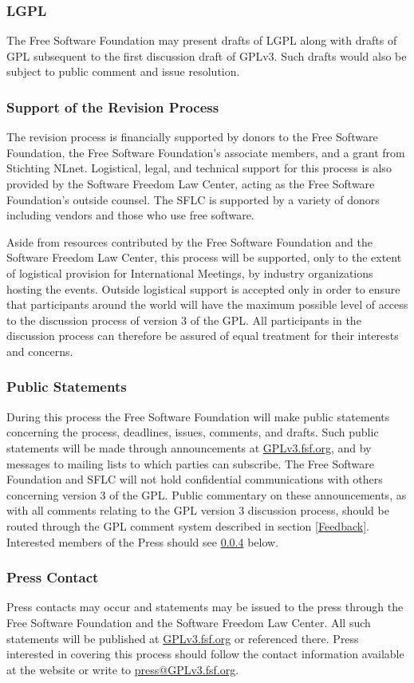 \documentclass[a4paper,spanish,12pt]{book}
\begin{document}
\subsubsection{LGPL} The Free Software Foundation may present drafts of LGPL
along with drafts of GPL subsequent to the first discussion draft of
GPLv3.  Such drafts would also be subject to public comment and issue
resolution.

\subsubsection{Support of the Revision Process} The revision process is
financially supported by donors to the Free Software Foundation, the
Free Software Foundation's associate members, and a grant from
Stichting NLnet.  Logistical, legal, and technical support for this
process is also provided by the Software Freedom Law Center, acting as
the Free Software Foundation's outside counsel.  The SFLC is supported
by a variety of donors including vendors and those who use free
software.

Aside from resources contributed by the Free Software Foundation and
the Software Freedom Law Center, this process will be supported, only
to the extent of logistical provision for International Meetings, by
industry organizations hosting the events.  Outside logistical support
is accepted only in order to ensure that participants around the world
will have the maximum possible level of access to the discussion
process of version 3 of the GPL\@.  All participants in the discussion
process can therefore be assured of equal treatment for their
interests and concerns.

\subsubsection{Public Statements} During this process the Free Software
Foundation will make public statements concerning the process,
deadlines, issues, comments, and drafts.  Such public statements will
be made through announcements at \url{GPLv3.fsf.org}, and by
messages to mailing lists to which parties can subscribe.  The Free
Software Foundation and SFLC will not hold confidential communications
with others concerning version 3 of the GPL\@.  Public commentary on
these announcements, as with all comments relating to the GPL version
3 discussion process, should be routed through the GPL comment system
described in section \ref{Feedback}.  Interested members of the Press
should see \ref{PressContact} below.

\subsubsection{Press Contact}\label{PressContact} Press contacts may occur
and statements may be issued to the press through the Free Software
Foundation and the Software Freedom Law Center.  All such statements
will be published at \url{GPLv3.fsf.org} or referenced there.
Press interested in covering this process should follow the contact
information available at the website or write to
\url{press@GPLv3.fsf.org}.
\end{document}
